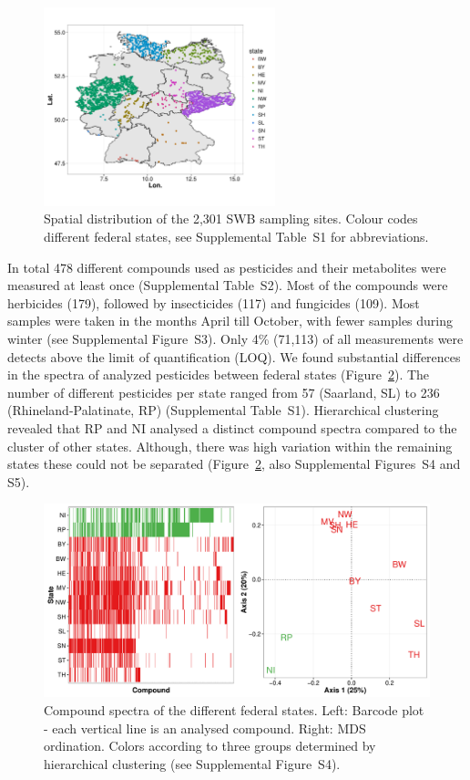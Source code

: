 \documentclass[journal=esthag,manuscript=article]{achemso}
\begin{document}
\begin{figure}[ht]
  \includegraphics[width=0.6\textwidth]{figure1.pdf}
  \caption{Spatial distribution of the 2,301 SWB sampling sites. Colour codes different federal states, see Supplemental Table~S1 for abbreviations.}
  \label{fig:fig1}
\end{figure}

In total 478 different compounds used as pesticides and their metabolites were measured at least once (Supplemental Table~S2). 
Most of the compounds were herbicides (179), followed by insecticides (117) and fungicides (109). %
Most samples were taken in the months April till October, with fewer samples during winter (see Supplemental Figure~S3).
Only 4\% (71,113) of all measurements were detects above the limit of quantification (LOQ).
We found substantial differences in the spectra of analyzed pesticides between federal states (Figure~\ref{fig:fig2}).
The number of different pesticides per state ranged from 57 (Saarland, SL) to 236 (Rhineland-Palatinate, RP) (Supplemental Table~S1).
Hierarchical clustering revealed that RP and NI analysed a distinct compound spectra compared to the cluster of other states.
Although, there was high variation within the remaining states these could not be separated (Figure~\ref{fig:fig2}, also Supplemental Figures~S4 and S5).

\begin{figure}[ht]
  \includegraphics[width=\textwidth]{figure2.pdf}
  \caption{Compound spectra of the different federal states. Left: Barcode plot - each vertical line is an analysed compound. Right: MDS ordination. 
  Colors according to three groups determined by hierarchical clustering (see Supplemental Figure~S4).}
  \label{fig:fig2}
\end{figure}
\end{document}
